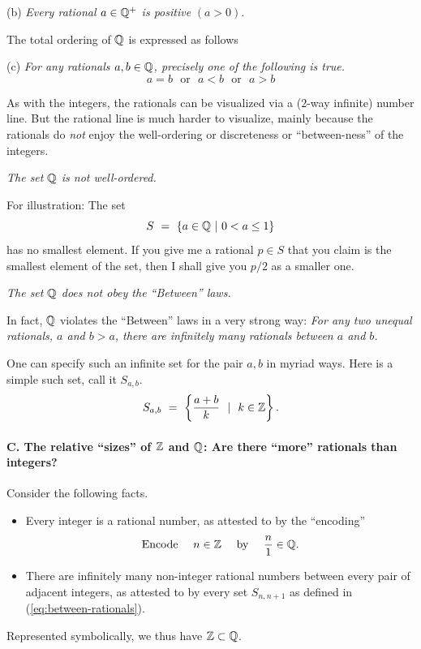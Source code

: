 \noindent (b)
{\it Every rational $a \in \mathbb{Q}^+$ is positive} $(a>0)$.

\medskip

\noindent
The total ordering of $\mathbb{Q}$ is expressed as follows 

\noindent (c)
{\it For any rationals $a, b \in \mathbb{Q}$, precisely one of the following
  is                               
  true.}
\[  a=b \ \ \ \mbox{or} \ \ \  a<b \ \ \ \mbox{or} \ \ \ a>b \]

\bigskip

As with the integers, the rationals can be visualized via a ($2$-way
infinite) number line.  But the rational line is much harder to
visualize, mainly because the rationals do {\em not} enjoy the
well-ordering or discreteness or ``between-ness'' of the integers.

\medskip

\noindent
{\em The set $\mathbb{Q}$ is {\em not} well-ordered.}

For illustration:  The set
\[ S \ = \ \{ a \in \mathbb{Q}  \ |\ 0 < a \leq 1 \} \]
has no smallest element.  If you give me a rational $p \in S$ that you
claim is the smallest element of the set, then I shall give you $p/2$
as a smaller one.

\medskip

\noindent
{\em The set $\mathbb{Q}$ does {\em not} obey the ``Between'' laws.}

In fact, $\mathbb{Q}$ violates the ``Between'' laws in a very strong way:
{\it For any two unequal rationals, $a$ and $b>a$, there are
  infinitely many rationals between $a$ and $b$.}

One can specify such an infinite set for the pair $a,b$ in myriad
ways.  Here is a simple such set, call it $S_{a,b}$.
\begin{equation}
\label{eq:between-rationals}
S_{a,b} \ = \ \left\{ \frac{a+b}{k} \ \ | \ \ k \in \mathbb{Z} \right\}.
\end{equation}


\paragraph{\small\sf C. The relative ``sizes'' of $\mathbb{Z}$ and $\mathbb{Q}$: Are
  there ``more'' rationals than integers?}

\noindent Consider the following facts.
\begin{itemize}
\item
Every integer is a rational number, as attested to by the ``encoding''
\begin{equation}
\label{eq:ZintoQ}
\mbox{Encode } \ \ \ n \in \mathbb{Z} \ \ \ \mbox{ by } \ \ \ {n \over 1} \in \mathbb{Q} .
\end{equation}

\item
There are infinitely many non-integer rational numbers between every
pair of adjacent integers, as attested to by every set $S_{n,n+1}$ as
defined in (\ref{eq:between-rationals}).
\end{itemize}
Represented symbolically, we thus have $\mathbb{Z} \subset \mathbb{Q}$.

